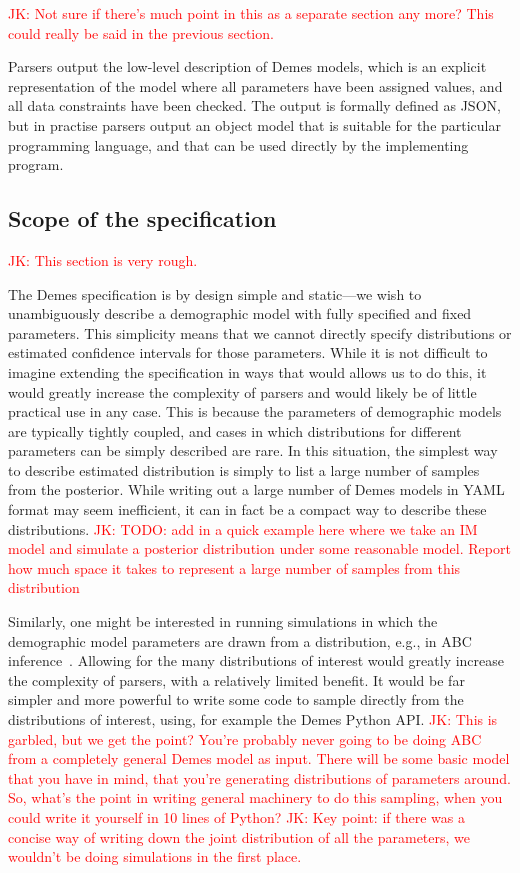 \documentclass[11pt]{article}
\newcommand{\jkcomment}[1]{{\textcolor{red}{JK: #1}}}
\begin{document}
\jkcomment{Not sure if there's much point in this as a separate section any
more? This could really be said in the previous section.}

Parsers output the low-level description of Demes models,
which is an explicit representation
of the model where all parameters have been assigned values, and
all data constraints have been checked. The output is formally defined
as JSON, but in practise parsers output an object model that
is suitable for the particular programming language, and
that can be used directly by the implementing program.


\subsection*{Scope of the specification}
\jkcomment{This section is very rough.}


The Demes specification is by design simple and static---we wish to
unambiguously describe a demographic model with fully specified
and fixed parameters. This simplicity means that we cannot directly
specify distributions or estimated confidence intervals
for those parameters. While it is not difficult to imagine extending
the specification in ways that would allows us to do this, it would
greatly increase the complexity of parsers and would likely be of
little practical use in any case. This is because the parameters of
demographic models are typically tightly coupled, and cases in which
distributions for different parameters can be simply described are rare.
In this situation, the simplest way to describe estimated
distribution is simply to list a large number of samples from
the posterior. While writing out a large number of Demes models in
YAML format may seem inefficient, it can in fact be a compact
way to describe these distributions.
\jkcomment{TODO: add in a quick example here where we take an IM model
and simulate a posterior distribution under some reasonable model. Report
how much space it takes to represent a large number of samples from this
distribution}

Similarly, one might be interested in running simulations in which
the demographic model parameters are drawn from a distribution, e.g.,
in ABC inference~\citep{beaumont2002approximate}. Allowing for
the many distributions of interest would greatly increase the complexity of
parsers, with a relatively limited benefit. It would be far simpler
and more powerful to write some code to sample directly from the
distributions of interest, using, for example the Demes Python
API.
\jkcomment{This is garbled, but we get the point? You're probably never
going to be doing ABC from a completely general Demes model as input.
There will be some basic model that you have in mind, that you're generating
distributions of parameters around. So, what's the point in writing
general machinery to do this sampling, when you could write it yourself in
10 lines of Python?}
\jkcomment{Key point: if there was a concise way of writing down the joint
distribution of all the parameters, we wouldn't be doing simulations in the
first place.}
\end{document}
